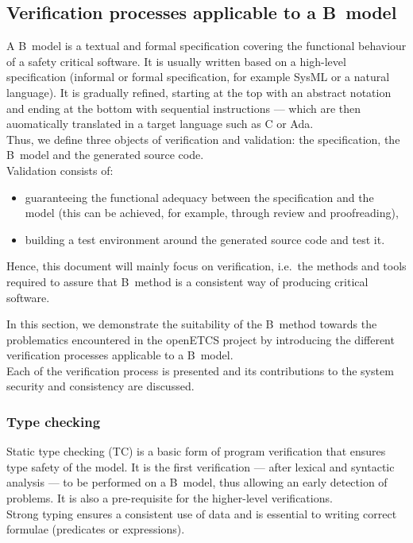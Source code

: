 \subsection{Verification processes applicable to a B~model}
\label{sec:processes}

A B~model is a textual and formal specification covering the functional behaviour of a safety critical software. It is usually written based on a high-level specification (informal or formal specification, for example SysML or a natural language). It is gradually refined, starting at the top with an abstract notation and ending at the bottom with sequential instructions --- which are then auomatically translated in a target language such as C or Ada.\\
Thus, we define three objects of verification and validation: the specification, the B~model and the generated source code.\\

Validation consists of:
\begin{itemize}
\item guaranteeing the functional adequacy between the specification and the model (this can be achieved, for example, through review and proofreading),
\item building a test environment around the generated source code and test it.
\end{itemize}
Hence, this document will mainly focus on verification, i.e.\ the methods and tools required to assure that B~method is a consistent way of producing critical software.

In this section, we demonstrate the suitability of the B~method towards the problematics encountered in the openETCS project by introducing the different verification processes applicable to a B~model.\\
Each of the verification process is presented and its contributions to the system security and consistency are discussed.

\subsubsection{Type checking}
Static type checking (TC) is a basic form of program verification that ensures type safety of the model. It is the first verification --- after lexical and syntactic analysis --- to be performed on a B~model, thus allowing an early detection of problems. It is also a pre-requisite for the higher-level verifications. \\
Strong typing ensures a consistent use of data and is essential to writing correct formulae (predicates or expressions).\\

